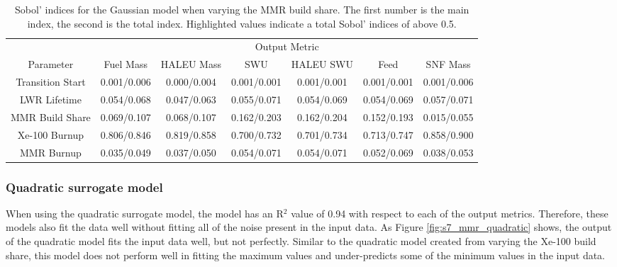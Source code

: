 \begin{table}[h!]
    \centering
    \caption{Sobol' indices for the Gaussian model when varying the MMR 
    build share. The first number is the main index, the second is the total 
    index. Highlighted 
    values indicate a total Sobol' indices of above 0.5.}
    \label{tab:s7_sobol_mmr_gaussian}
    \begin{tabular}{c c c c c c c}
        \hline
        & \multicolumn{6}{c}{Output Metric} \\
        Parameter & Fuel Mass & HALEU Mass & SWU & HALEU SWU & Feed & SNF Mass \\
        \hline
        Transition Start & 0.001/0.006 & 0.000/0.004 & 0.001/0.001 &
                           0.001/0.001 & 0.001/0.001 & 0.001/0.006\\
        LWR Lifetime & 0.054/0.068 & 0.047/0.063 & 0.055/0.071 &
                       0.054/0.069 & 0.054/0.069 & 0.057/0.071\\
        MMR Build Share & 0.069/0.107 & 0.068/0.107 & 0.162/0.203 &
                          0.162/0.204 & 0.152/0.193 & 0.015/0.055\\
        Xe-100 Burnup & \cellcolor{green!25}0.806/0.846 & \cellcolor{green!25}0.819/0.858 & \cellcolor{green!25}0.700/0.732 &
        \cellcolor{green!25}0.701/0.734 & \cellcolor{green!25}0.713/0.747 & \cellcolor{green!25}0.858/0.900\\
        MMR Burnup & 0.035/0.049 & 0.037/0.050 & 0.054/0.071 &
                     0.054/0.071 & 0.052/0.069 & 0.038/0.053\\
        \hline        
    \end{tabular}
\end{table}

\subsubsection{Quadratic surrogate model}
When using the quadratic surrogate model, the model has an R$^2$ value of 0.94
with respect to each of the output metrics. Therefore, these models also fit 
the data well without fitting all of the noise present in the input data. 
As Figure \ref{fig:s7_mmr_quadratic} shows, the output of the quadratic model 
fits the input data well, but not perfectly. Similar to the quadratic 
model created from varying the Xe-100 build share, this model 
does not perform well in fitting the maximum values and under-predicts 
some of the minimum values in the input data. 

